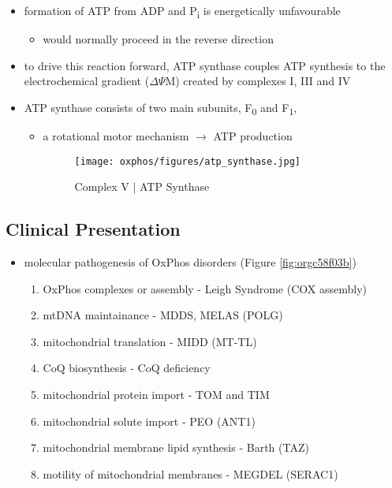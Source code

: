 \documentclass[12pt]{scrartcl}
\begin{document}
{\small{}}

\begin{itemize}
\item formation of ATP from ADP and P\textsubscript{i} is energetically unfavourable
\begin{itemize}
\item would normally proceed in the reverse direction
\end{itemize}

\item to drive this reaction forward, ATP synthase couples ATP synthesis
to the electrochemical gradient (\(\Delta \Psi\)M) created by complexes
I, III and IV
\item ATP synthase consists of two main subunits, F\textsubscript{0} and F\textsubscript{1},
\begin{itemize}
\item a rotational motor mechanism \(\to\) ATP production

\begin{figure}[htbp]
\centering
\texttt{[image: oxphos/figures/atp\_synthase.jpg]}
\caption{\label{fig:org57edf49}Complex V | ATP Synthase}
\end{figure}
\end{itemize}
\end{itemize}

\subsection{Clinical Presentation}
\label{sec:orgc2ed661}
\begin{itemize}
\item molecular pathogenesis of OxPhos disorders (Figure \ref{fig:orgc58f03b})
\begin{enumerate}
\item OxPhos complexes or assembly - Leigh Syndrome (COX assembly)
\item mtDNA maintainance - MDDS, MELAS (POLG)
\item mitochondrial translation - MIDD (MT-TL)
\item CoQ biosynthesis - CoQ deficiency
\item mitochondrial protein import - TOM and TIM
\item mitochondrial solute import - PEO (ANT1)
\item mitochondrial membrane lipid synthesis - Barth (TAZ)
\item motility of mitochondrial membranes - MEGDEL (SERAC1)
\end{enumerate}
\end{itemize}
\end{document}
